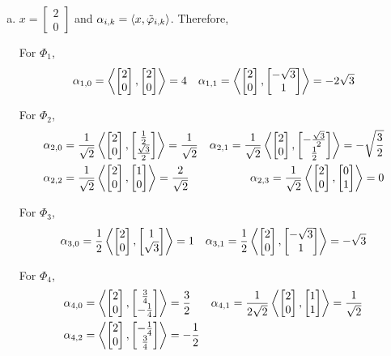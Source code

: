 \begin{enumerate}[(a)]
\item $x = \begin{bmatrix}2 \\ 0\end{bmatrix}$ and $\alpha_{i,k} = \innerprod{x}{\tilde{\varphi}_{i,k}}$. Therefore,

For $\Phi_1$,
\begin{align*}
	&\alpha_{1,0} = \innerprod{\vect{2\\0}}{\vect{2\\0}} = 4
	&\alpha_{1,1} = \innerprod{\vect{2\\0}}{\vect{-\sqrt{3}\\1}} = -2\sqrt{3}
\end{align*}

For $\Phi_2$,
\begin{align*}
	&\alpha_{2,0} = \frac{1}{\sqrt{2}}\innerprod{\vect{2\\0}}{\vect{\frac{1}{2}\\\frac{\sqrt{3}}{2}}} = \frac{1}{\sqrt{2}}
	&\alpha_{2,1} = \frac{1}{\sqrt{2}}\innerprod{\vect{2\\0}}{\vect{-\frac{\sqrt{3}}{2} \\ \frac{1}{2}}} = -\sqrt{\frac{3}{2}} \\
	&\alpha_{2,2} = \frac{1}{\sqrt{2}}\innerprod{\vect{2\\0}}{\vect{1\\0}} =  \frac{2}{\sqrt{2}}
	&\alpha_{2,3} = \frac{1}{\sqrt{2}}\innerprod{\vect{2\\0}}{\vect{0\\1}} = 0
\end{align*}

For $\Phi_3$,
\begin{align*}
	&\alpha_{3,0} = \frac{1}{2}\innerprod{\vect{2\\0}}{\vect{1\\\sqrt{3}}} = 1
	&\alpha_{3,1} = \frac{1}{2}\innerprod{\vect{2\\0}}{\vect{-\sqrt{3}\\1}} = -\sqrt{3}
\end{align*}

For $\Phi_4$,
\begin{align*}
	&\alpha_{4,0} = \innerprod{\vect{2\\0}}{\vect{\frac{3}{4}\\-\frac{1}{4}}} = \frac{3}{2}
	&\alpha_{4,1} = \frac{1}{2\sqrt{2}}\innerprod{\vect{2\\0}}{\vect{1\\1}} = \frac{1}{\sqrt{2}}\\
	&\alpha_{4,2} = \innerprod{\vect{2\\0}}{\vect{-\frac{1}{4}\\ \frac{3}{4}}} = -\frac{1}{2}
\end{align*}


\end{enumerate}

